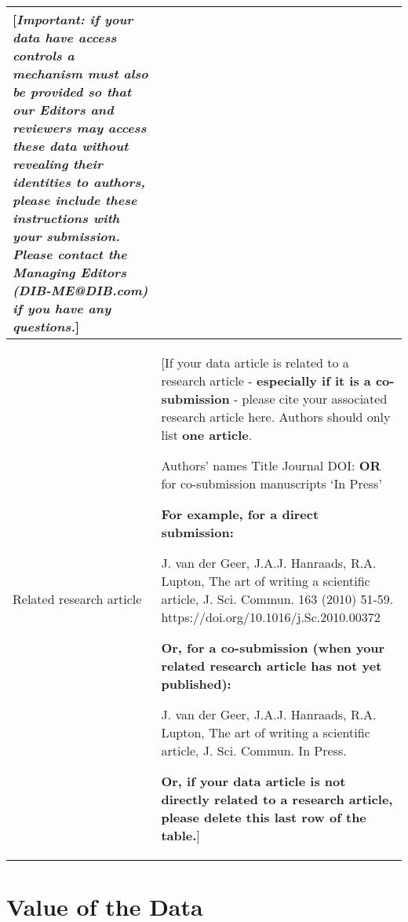 \documentclass[times,final]{elsarticle}
\begin{document}
{\begin{longtable}{|p{33mm}|p{94mm}|}
                         [\textit{Important: if your data have access controls a mechanism must also be
                         provided so that our Editors and reviewers may access these data
                         without revealing their identities to authors, please include
                         these instructions with your submission. Please contact the Managing
                         Editors (DIB-ME@DIB.com) if you have any questions.}]\\
\hline
Related
research\newline
article                & [If your data article is related to a research article - \textbf{especially
                         if it is a co-submission} - please cite your associated research
                         article here. Authors should only list \textbf{one article}.\newline

                         Authors' names\newline
                         Title\newline
                         Journal\newline
                         DOI: \textbf{OR} for co-submission manuscripts `In Press'\newline

                         \textbf{For example, for a direct submission:}\newline

                         J. van der Geer, J.A.J. Hanraads, R.A. Lupton, The art of writing a scientific article,
                         J. Sci. Commun. 163 (2010) 51-59. https://doi.org/10.1016/j.Sc.2010.00372\newline

                         \textbf{Or, for a co-submission (when your related research article has not yet published):}\newline

                         J. van der Geer, J.A.J. Hanraads, R.A. Lupton, The art of writing a
                         scientific article, J. Sci. Commun. In Press.\newline

                         \textbf{Or, if your data article is not directly related to a research article,
                         please delete this last row of the table.}]
\end{longtable}
}

\section*{Value of the Data}
\end{document}
